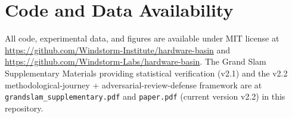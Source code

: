 \documentclass[12pt,a4paper]{article}
\begin{document}
\section*{Code and Data Availability}

All code, experimental data, and figures are available under MIT license at \url{https://github.com/Windstorm-Institute/hardware-basin} and \url{https://github.com/Windstorm-Labs/hardware-basin}. The Grand Slam Supplementary Materials providing statistical verification (v2.1) and the v2.2 methodological-journey + adversarial-review-defense framework are at \texttt{grandslam\_supplementary.pdf} and \texttt{paper.pdf} (current version v2.2) in this repository.
\end{document}
